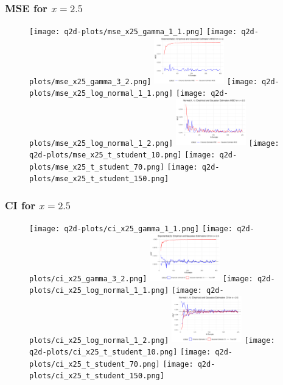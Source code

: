 \documentclass{article}
\begin{document}
{\subsubsection*{MSE for $x = 2.5$}

\begin{figure}[H]
  \centering
  \texttt{[image: q2d-plots/mse\_x25\_gamma\_1\_1.png]}
  \texttt{[image: q2d-plots/mse\_x25\_gamma\_3\_2.png]}
  \includegraphics[width=115px]{q2d-plots/mse_x25_exponential.png}
  \texttt{[image: q2d-plots/mse\_x25\_log\_normal\_1\_1.png]}
  \texttt{[image: q2d-plots/mse\_x25\_log\_normal\_1\_2.png]}
  \includegraphics[width=115px]{q2d-plots/mse_x25_normal.png}
  \texttt{[image: q2d-plots/mse\_x25\_t\_student\_10.png]}
  \texttt{[image: q2d-plots/mse\_x25\_t\_student\_70.png]}
  \texttt{[image: q2d-plots/mse\_x25\_t\_student\_150.png]}
  \label{fig:mse_x25}
\end{figure}

\subsubsection*{CI for $x = 2.5$}


\begin{figure}[H]
  \centering
  \texttt{[image: q2d-plots/ci\_x25\_gamma\_1\_1.png]}
  \texttt{[image: q2d-plots/ci\_x25\_gamma\_3\_2.png]}
  \includegraphics[width=115px]{q2d-plots/ci_x25_exponential.png}
  \texttt{[image: q2d-plots/ci\_x25\_log\_normal\_1\_1.png]}
  \texttt{[image: q2d-plots/ci\_x25\_log\_normal\_1\_2.png]}
  \includegraphics[width=115px]{q2d-plots/ci_x25_normal.png}
  \texttt{[image: q2d-plots/ci\_x25\_t\_student\_10.png]}
  \texttt{[image: q2d-plots/ci\_x25\_t\_student\_70.png]}
  \texttt{[image: q2d-plots/ci\_x25\_t\_student\_150.png]}
  \label{fig:ci_x25}
\end{figure}
}
\end{document}
